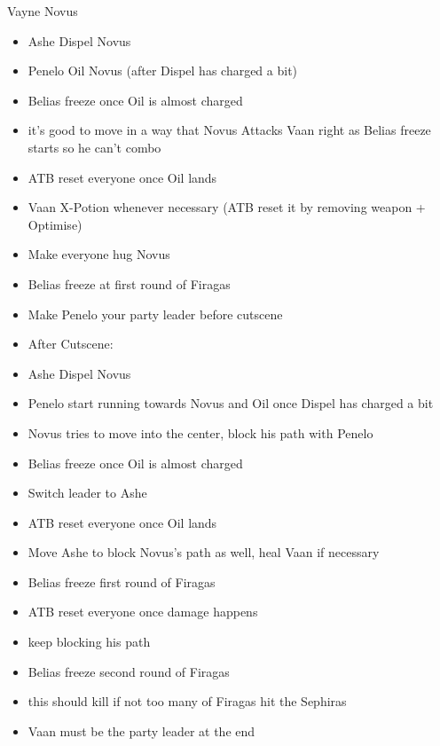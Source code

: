 \begin{battle}{Vayne Novus}
\begin{itemize}
	\item  Ashe Dispel Novus
	\item  Penelo Oil Novus (after Dispel has charged a bit)
	\item  Belias freeze once Oil is almost charged
		\item  it's good to move in a way that Novus Attacks Vaan right as Belias freeze starts so he can't combo
	\item  ATB reset everyone once Oil lands
	\item  Vaan X-Potion whenever necessary (ATB reset it by removing weapon + Optimise)
	\item  Make everyone hug Novus
	\item  Belias freeze at first round of Firagas
	\item  Make Penelo your party leader before cutscene
	\item  After Cutscene:
		\item  Ashe Dispel Novus
		\item  Penelo start running towards Novus and Oil once Dispel has charged a bit
		\item  Novus tries to move into the center, block his path with Penelo
		\item  Belias freeze once Oil is almost charged
		\item  Switch leader to Ashe
		\item  ATB reset everyone once Oil lands
		\item  Move Ashe to block Novus's path as well, heal Vaan if necessary
		\item  Belias freeze first round of Firagas
		\item  ATB reset everyone once damage happens
		\item  keep blocking his path
		\item  Belias freeze second round of Firagas
			\item  this should kill if not too many of Firagas hit the Sephiras
		\item  Vaan must be the party leader at the end
\end{itemize}
\end{battle}
